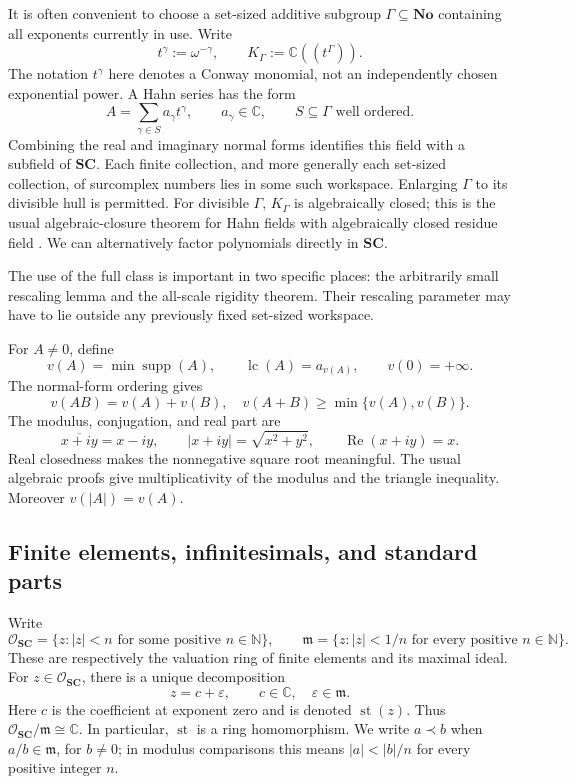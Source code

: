 \documentclass[11pt,letterpaper]{article}
\theoremstyle{definition}
\theoremstyle{remark}
\newcommand{\No}{\mathbf{No}}
\newcommand{\SC}{\mathbf{SC}}
\newcommand{\C}{\mathbb C}
\newcommand{\N}{\mathbb N}
\newcommand{\OO}{\mathcal O}
\newcommand{\mm}{\mathfrak m}
\newcommand{\st}{\operatorname{st}}
\newcommand{\supp}{\operatorname{supp}}
\newcommand{\re}{\operatorname{Re}}
\DeclareMathOperator{\lc}{lc}
\numberwithin{equation}{section}
\begin{document}
It is often convenient to choose a set-sized additive subgroup $\Gamma\subseteq\No$ containing all exponents currently in use. Write
\[
 t^\gamma:=\omega^{-\gamma},\qquad
 K_\Gamma:=\C((t^\Gamma)).
\]
The notation $t^\gamma$ here denotes a Conway monomial, not an independently chosen exponential power. A Hahn series has the form
\begin{equation}\label{eq:hahn}
 A=\sum_{\gamma\in S}a_\gamma t^\gamma,
 \qquad a_\gamma\in\C,
 \qquad S\subseteq\Gamma\text{ well ordered}.
\end{equation}
Combining the real and imaginary normal forms identifies this field with a subfield of $\SC$. Each finite collection, and more generally each set-sized collection, of surcomplex numbers lies in some such workspace. Enlarging $\Gamma$ to its divisible hull is permitted. For divisible $\Gamma$, $K_\Gamma$ is algebraically closed; this is the usual algebraic-closure theorem for Hahn fields with algebraically closed residue field \cite[Corollary 4]{Poonen}. We can alternatively factor polynomials directly in $\SC$.

The use of the full class is important in two specific places: the arbitrarily small rescaling lemma and the all-scale rigidity theorem. Their rescaling parameter may have to lie outside any previously fixed set-sized workspace.

For $A\ne0$, define
\[
 v(A)=\min\supp(A),\qquad
 \lc(A)=a_{v(A)},\qquad v(0)=+\infty.
\]
The normal-form ordering gives
\begin{equation}\label{eq:valuation}
 v(AB)=v(A)+v(B),\quad
 v(A+B)\ge\min\{v(A),v(B)\}.
\end{equation}
The modulus, conjugation, and real part are
\[
 \overline{x+iy}=x-iy,\qquad |x+iy|=\sqrt{x^2+y^2},\qquad
 \re(x+iy)=x.
\]
Real closedness makes the nonnegative square root meaningful. The usual algebraic proofs give multiplicativity of the modulus and the triangle inequality. Moreover $v(|A|)=v(A)$.

\subsection{Finite elements, infinitesimals, and standard parts}
Write
\[
 \OO_{\SC}=\{z:|z|<n\text{ for some positive }n\in\N\},\qquad
 \mm=\{z:|z|<1/n\text{ for every positive }n\in\N\}.
\]
These are respectively the valuation ring of finite elements and its maximal ideal. For $z\in\OO_{\SC}$, there is a unique decomposition
\begin{equation}\label{eq:standardpart}
 z=c+\varepsilon,\qquad c\in\C,\quad\varepsilon\in\mm.
\end{equation}
Here $c$ is the coefficient at exponent zero and is denoted $\st(z)$. Thus $\OO_{\SC}/\mm\cong\C$. In particular, $\st$ is a ring homomorphism. We write $a\prec b$ when $a/b\in\mm$, for $b\ne0$; in modulus comparisons this means $|a|<|b|/n$ for every positive integer $n$.
\end{document}
